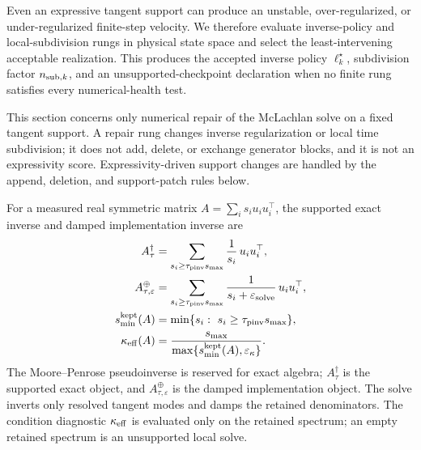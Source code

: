 \documentclass[
  reprint,
  amsmath,
  amssymb,
  aps,
  pra,
  nofootinbib,
  superscriptaddress,
  floatfix
]{revtex4-2}
\newcommand{\eps}{\varepsilon}
\begin{document}
Even an expressive tangent support can produce an unstable, over-regularized, or under-regularized finite-step velocity.  We therefore evaluate inverse-policy and local-subdivision rungs in physical state space and select the least-intervening acceptable realization.  This produces the accepted inverse policy $\ell_k^\star$, subdivision factor $n_{{\rm sub},k}$, and an unsupported-checkpoint declaration when no finite rung satisfies every numerical-health test.

This section concerns only numerical repair of the McLachlan solve on a fixed tangent support.  A repair rung changes inverse regularization or local time subdivision; it does not add, delete, or exchange generator blocks, and it is not an expressivity score.  Expressivity-driven support changes are handled by the append, deletion, and support-patch rules below.

For a measured real symmetric matrix $A=\sum_i s_i u_i u_i^\top$, the supported exact inverse and damped implementation inverse are
\begin{equation}
\begin{aligned}
A_{\tau}^{\dagger}
&=
\sum_{s_i\ge\tau_{\rm pinv}s_{\max}}
\frac{1}{s_i}\,u_i u_i^\top,
\\
A_{\tau,\eps}^{\oplus}
&=
\sum_{s_i\ge\tau_{\rm pinv}s_{\max}}
\frac{1}{s_i+\eps_{\rm solve}}\,u_i u_i^\top,
\\
s_{\min}^{\rm kept}(A)
&=
\min\{s_i:\ s_i\ge\tau_{\rm pinv}s_{\max}\},
\\
\kappa_{\rm eff}(A)
&=
\frac{s_{\max}}
{\max\{s_{\min}^{\rm kept}(A),\eps_\kappa\}} .
\end{aligned}
\label{eq:supported_inverse}
\end{equation}
The Moore--Penrose pseudoinverse is reserved for exact algebra; $A_\tau^\dagger$ is the supported exact object, and $A_{\tau,\eps}^{\oplus}$ is the damped implementation object.  The solve inverts only resolved tangent modes and damps the retained denominators.  The condition diagnostic $\kappa_{\rm eff}$ is evaluated only on the retained spectrum; an empty retained spectrum is an unsupported local solve.
\end{document}
